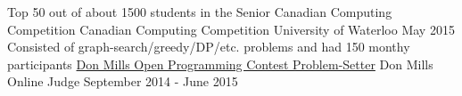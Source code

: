 \begin{cventries}
	\cventry
	{Top 50 out of about 1500 students in the Senior Canadian Computing Competition}
	{Canadian Computing Competition}
	{University of Waterloo}
	{May 2015}
	{}
	\cventry
    {Consisted of graph-search/greedy/DP/etc. problems and had 150 monthy participants}
    {\href{https://dmoj.ca/user/Sentient/solved}{Don Mills Open Programming Contest Problem-Setter}}
    {Don Mills Online Judge}
    {September 2014 - June 2015}
    {}
\end{cventries}
